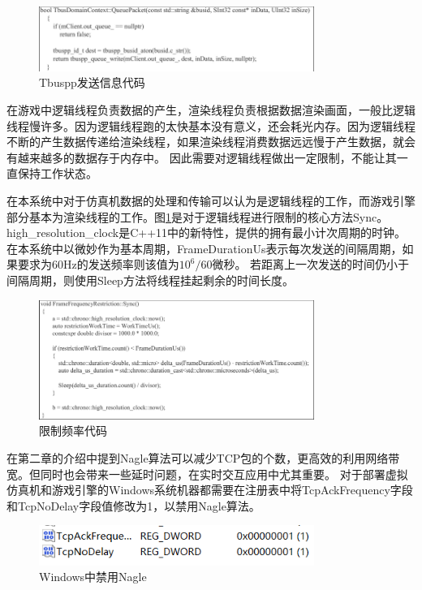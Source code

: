 \begin{figure}[h!]
    \begin{center}
        \includegraphics[width=0.8\textwidth]{pictures/code21.pdf}
        \caption{Tbuspp发送信息代码}
    \end{center}
\end{figure}
\par
在游戏中逻辑线程负责数据的产生，渲染线程负责根据数据渲染画面，一般比逻辑线程慢许多。因为逻辑线程跑的太快基本没有意义，还会耗光内存。因为逻辑线程不断的产生数据传递给渲染线程，如果渲染线程消费数据远远慢于产生数据，就会有越来越多的数据存于内存中。
因此需要对逻辑线程做出一定限制，不能让其一直保持工作状态。
\par
在本系统中对于仿真机数据的处理和传输可以认为是逻辑线程的工作，而游戏引擎部分基本为渲染线程的工作。图\ref{sync}是对于逻辑线程进行限制的核心方法Sync。
high\_resolution\_clock是C++11中的新特性，提供的拥有最小计次周期的时钟。在本系统中以微妙作为基本周期，FrameDurationUs表示每次发送的间隔周期，如果要求为60Hz的发送频率则该值为$10^6/60$微秒。
若距离上一次发送的时间仍小于间隔周期，则使用Sleep方法将线程挂起剩余的时间长度。
\begin{figure}[h!]
    \begin{center}
        \includegraphics[width=0.8\textwidth]{pictures/code22.pdf}
        \caption{限制频率代码}
        \label{sync}
    \end{center}
\end{figure}
\par
在第二章的介绍中提到Nagle算法可以减少TCP包的个数，更高效的利用网络带宽。但同时也会带来一些延时问题，在实时交互应用中尤其重要。
对于部署虚拟仿真机和游戏引擎的Windows系统机器都需要在注册表中将TcpAckFrequency字段和TcpNoDelay字段值修改为1，以禁用Nagle算法。
\begin{figure}[h!]
    \begin{center}
        \includegraphics[width=0.8\textwidth]{pictures/nagle.png}
        \caption{Windows中禁用Nagle}
    \end{center}
\end{figure}
